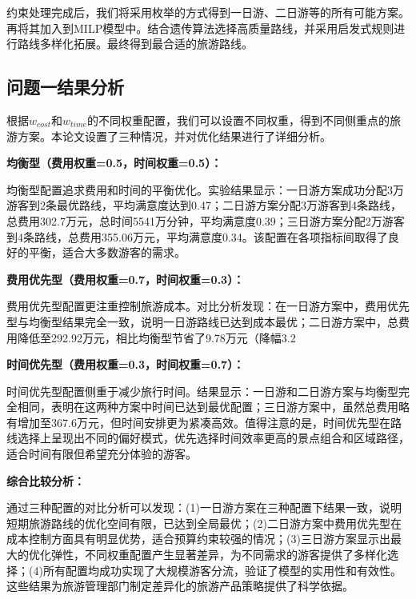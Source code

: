 约束处理完成后，我们将采用枚举的方式得到一日游、二日游等的所有可能方案。再将其加入到MILP模型中。结合遗传算法选择高质量路线，并采用启发式规则进行路线多样化拓展。最终得到最合适的旅游路线。

\subsection[\hspace{-2pt}问题一结果分析]{{\heiti{} \hspace{-8pt}问题一结果分析}}\label{section4: 问题一结果分析}

根据$w_{cost}$和$w_{time}$的不同权重配置，我们可以设置不同权重，得到不同侧重点的旅游方案。本论文设置了三种情况，并对优化结果进行了详细分析。

\textbf{均衡型（费用权重=0.5，时间权重=0.5）：}

均衡型配置追求费用和时间的平衡优化。实验结果显示：一日游方案成功分配3万游客到2条最优路线，平均满意度达到0.47；二日游方案分配3万游客到4条路线，总费用302.7万元，总时间5541万分钟，平均满意度0.39；三日游方案分配2万游客到4条路线，总费用355.06万元，平均满意度0.34。该配置在各项指标间取得了良好的平衡，适合大多数游客的需求。

\textbf{费用优先型（费用权重=0.7，时间权重=0.3）：}

费用优先型配置更注重控制旅游成本。对比分析发现：在一日游方案中，费用优先型与均衡型结果完全一致，说明一日游路线已达到成本最优；二日游方案中，总费用降低至292.92万元，相比均衡型节省了9.78万元（降幅3.2%

\textbf{时间优先型（费用权重=0.3，时间权重=0.7）：}

时间优先型配置侧重于减少旅行时间。结果显示：一日游和二日游方案与均衡型完全相同，表明在这两种方案中时间已达到最优配置；三日游方案中，虽然总费用略有增加至367.6万元，但时间安排更为紧凑高效。值得注意的是，时间优先型在路线选择上呈现出不同的偏好模式，优先选择时间效率更高的景点组合和区域路径，适合时间有限但希望充分体验的游客。

\textbf{综合比较分析：}

通过三种配置的对比分析可以发现：(1)一日游方案在三种配置下结果一致，说明短期旅游路线的优化空间有限，已达到全局最优；(2)二日游方案中费用优先型在成本控制方面具有明显优势，适合预算约束较强的情况；(3)三日游方案显示出最大的优化弹性，不同权重配置产生显著差异，为不同需求的游客提供了多样化选择；(4)所有配置均成功实现了大规模游客分流，验证了模型的实用性和有效性。这些结果为旅游管理部门制定差异化的旅游产品策略提供了科学依据。



